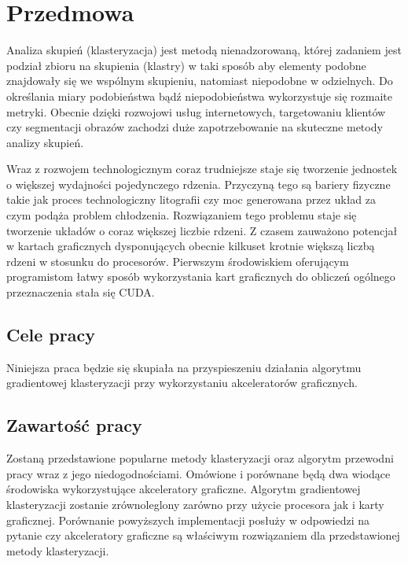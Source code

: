 \chapter{Przedmowa}
\label{cha:przedmowa}

Analiza skupień (klasteryzacja) jest metodą nienadzorowaną, której zadaniem jest podział zbioru na skupienia (klastry) w taki sposób aby elementy podobne znajdowały się we wspólnym skupieniu, natomiast niepodobne w odzielnych. Do określania miary podobieństwa bądź niepodobieństwa wykorzystuje się rozmaite metryki. Obecnie dzięki rozwojowi usług internetowych, targetowaniu klientów czy segmentacji obrazów zachodzi duże zapotrzebowanie na skuteczne metody analizy skupień.

Wraz z rozwojem technologicznym coraz trudniejsze staje się tworzenie jednostek o większej wydajności pojedynczego rdzenia. Przyczyną tego są bariery fizyczne takie jak proces technologiczny litografii czy moc generowana przez układ za czym podąża problem chłodzenia. Rozwiązaniem tego problemu staje się tworzenie układów o coraz większej liczbie rdzeni. Z czasem zauważono potencjał w kartach graficznych dysponujących obecnie kilkuset krotnie większą liczbą rdzeni w stosunku do procesorów. Pierwszym środowiskiem oferującym programistom łatwy sposób wykorzystania kart graficznych do obliczeń ogólnego przeznaczenia stała się CUDA.

\section{Cele pracy}
\label{sec:celePracy}

Niniejsza praca będzie się skupiała na przyspieszeniu działania algorytmu gradientowej klasteryzacji przy wykorzystaniu akceleratorów graficznych.



\section{Zawartość pracy}
\label{sec:zawartoscPracy}

Zostaną przedstawione popularne metody klasteryzacji oraz algorytm przewodni pracy wraz z jego niedogodnościami. Omówione i porównane będą dwa wiodące środowiska wykorzystujące akceleratory graficzne. Algorytm gradientowej klasteryzacji zostanie zrównoleglony zarówno przy użycie procesora jak i karty graficznej. Porównanie powyższych implementacji posłuży w odpowiedzi na pytanie czy akceleratory graficzne są właściwym rozwiązaniem dla przedstawionej metody klasteryzacji.